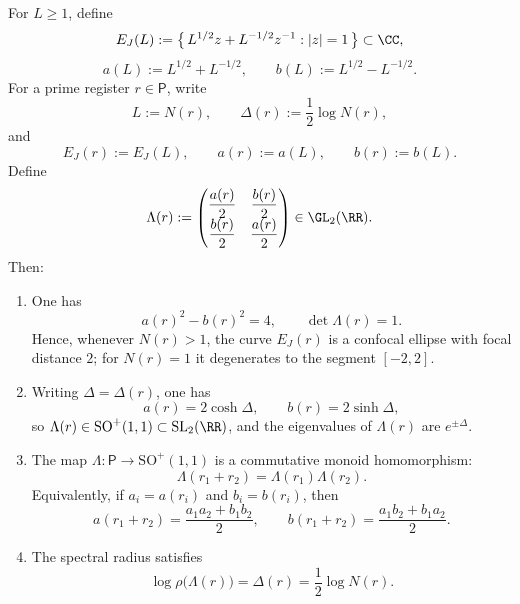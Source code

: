 \begin{theorem}\label{thm:capacity-scaled-prime-representation}
For \(L\ge 1\), define
\[
E_J(L):=\bigl\{\,L^{1/2}z+L^{-1/2}z^{-1}:|z|=1\,\bigr\}\subset\CC,
\]
\[
a(L):=L^{1/2}+L^{-1/2},
\qquad
b(L):=L^{1/2}-L^{-1/2}.
\]
For a prime register \(r\in\mathsf P\), write
\[
L:=N(r),
\qquad
\Delta(r):=\frac12\log N(r),
\]
and
\[
E_J(r):=E_J(L),
\qquad
a(r):=a(L),
\qquad
b(r):=b(L).
\]
Define
\[
\Lambda(r):=
\begin{pmatrix}
\dfrac{a(r)}{2} & \dfrac{b(r)}{2}\\[2pt]
\dfrac{b(r)}{2} & \dfrac{a(r)}{2}
\end{pmatrix}\in\GL_2(\RR).
\]
Then:
\begin{enumerate}
  \item One has
  \[
  a(r)^2-b(r)^2=4,
  \qquad
  \det\Lambda(r)=1.
  \]
  Hence, whenever \(N(r)>1\), the curve \(E_J(r)\) is a confocal ellipse with focal distance \(2\); for \(N(r)=1\) it degenerates to the segment \([-2,2]\).

  \item Writing \(\Delta=\Delta(r)\), one has
  \[
  a(r)=2\cosh\Delta,
  \qquad
  b(r)=2\sinh\Delta,
  \]
  so \(\Lambda(r)\in \mathrm{SO}^+(1,1)\subset \mathrm{SL}_2(\RR)\), and the eigenvalues of \(\Lambda(r)\) are \(e^{\pm\Delta}\).

  \item The map \(\Lambda:\mathsf P\to \mathrm{SO}^+(1,1)\) is a commutative monoid homomorphism:
  \[
  \Lambda(r_1+r_2)=\Lambda(r_1)\Lambda(r_2).
  \]
  Equivalently, if \(a_i=a(r_i)\) and \(b_i=b(r_i)\), then
  \[
  a(r_1+r_2)=\frac{a_1a_2+b_1b_2}{2},
  \qquad
  b(r_1+r_2)=\frac{a_1b_2+b_1a_2}{2}.
  \]

  \item The spectral radius satisfies
  \[
  \log\rho\bigl(\Lambda(r)\bigr)=\Delta(r)=\frac12\log N(r).
  \]
\end{enumerate}
\end{theorem}

